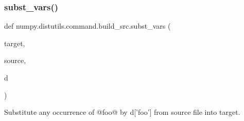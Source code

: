 \mbox{\label{namespacenumpy_1_1distutils_1_1command_1_1build__src_a49a36b2e7c17fc9ca13a4d3093890804}} 
\subsubsection{\texorpdfstring{subst\+\_\+vars()}{subst\_vars()}}
{\footnotesize\ttfamily def numpy.\+distutils.\+command.\+build\+\_\+src.\+subst\+\_\+vars (\begin{DoxyParamCaption}\item[{}]{target,  }\item[{}]{source,  }\item[{}]{d }\end{DoxyParamCaption})}

\begin{DoxyVerb}Substitute any occurrence of @foo@ by d['foo'] from source file into
target.\end{DoxyVerb}
 